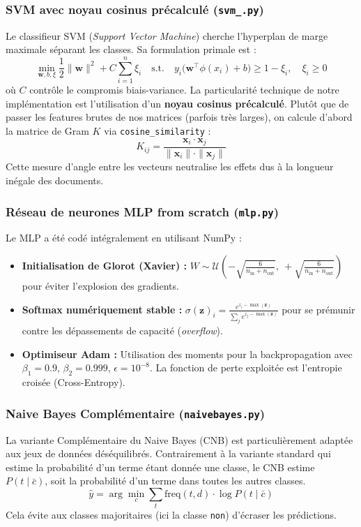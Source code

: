 \documentclass[12pt,a4paper]{article}
\begin{document}
\subsubsection{SVM avec noyau cosinus précalculé (\texttt{svm\_.py})}
Le classifieur SVM (\textit{Support Vector Machine}) cherche l'hyperplan de marge maximale séparant les classes. Sa formulation primale est :
$$
\min_{\mathbf{w}, b, \xi} \frac{1}{2}\|\mathbf{w}\|^2 + C \sum_{i=1}^n \xi_i
\quad \text{s.t.} \quad y_i\bigl(\mathbf{w}^\top \phi(x_i) + b\bigr) \geq 1 - \xi_i,\quad \xi_i \geq 0
$$
où $C$ contrôle le compromis biais-variance. La particularité technique de notre implémentation est l'utilisation d'un \textbf{noyau cosinus précalculé}. Plutôt que de passer les features brutes de nos matrices (parfois très larges), on calcule d'abord la matrice de Gram $K$ via \texttt{cosine\_similarity} :
$$
K_{ij} = \frac{\mathbf{x}_i \cdot \mathbf{x}_j}{\|\mathbf{x}_i\| \cdot \|\mathbf{x}_j\|}
$$
Cette mesure d'angle entre les vecteurs neutralise les effets dus à la longueur inégale des documents.

\subsubsection{Réseau de neurones MLP from scratch (\texttt{mlp.py})}
Le MLP a été codé intégralement en utilisant NumPy :
\begin{itemize}
    \item \textbf{Initialisation de Glorot (Xavier) :} $W \sim \mathcal{U}\!\left(-\sqrt{\frac{6}{n_{\mathrm{in}} + n_{\mathrm{out}}}},\ +\sqrt{\frac{6}{n_{\mathrm{in}} + n_{\mathrm{out}}}}\right)$ pour éviter l'explosion des gradients.
    \item \textbf{Softmax numériquement stable :} $\sigma(\mathbf{z})_i = \frac{e^{z_i - \max(\mathbf{z})}}{\sum_j e^{z_j - \max(\mathbf{z})}}$ pour se prémunir contre les dépassements de capacité (\textit{overflow}).
    \item \textbf{Optimiseur Adam :} Utilisation des moments pour la backpropagation avec $\beta_1=0.9$, $\beta_2=0.999$, $\epsilon=10^{-8}$. La fonction de perte exploitée est l'entropie croisée (Cross-Entropy).
\end{itemize}

\subsubsection{Naive Bayes Complémentaire (\texttt{naivebayes.py})}
La variante Complémentaire du Naive Bayes (CNB) est particulièrement adaptée aux jeux de données déséquilibrés. Contrairement à la variante standard qui estime la probabilité d'un terme étant donnée une classe, le CNB estime $P(t \mid \bar{c})$, soit la probabilité d'un terme dans toutes les autres classes.
$$
\hat{y} = \arg\min_{c} \sum_{t} \text{freq}(t, d) \cdot \log P(t \mid \bar{c})
$$
Cela évite aux classes majoritaires (ici la classe \texttt{non}) d'écraser les prédictions.
\end{document}
